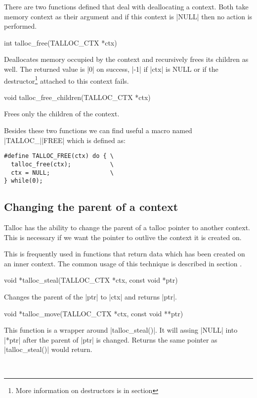 There are two functions defined that deal with deallocating a context. Both
take memory context as their argument and if this context is |NULL| then no
action is performed.

\begin{funcproto}
int talloc_free(TALLOC_CTX *ctx)
\end{funcproto}
\begin{funcdesc}
  Deallocates memory occupied by the context and recursively frees its 
  children as well. The returned value is |0| on success, |-1| if |ctx| is NULL
  or if the destructor\footnote{More information on destructors is in section
  } attached to this context fails.
\end{funcdesc}
\begin{funcproto}
void talloc_free_children(TALLOC_CTX *ctx)
\end{funcproto}
\begin{funcdesc}
  Frees only the children of the context.
\end{funcdesc}
\funclistend
Besides these two functions we can find useful a macro named |TALLOC_||FREE|
which is defined as:

\begin{lstlisting}[caption={TALLOC_FREE(ctx)},label=lst:TALLOC_FREE]
#define TALLOC_FREE(ctx) do { \
  talloc_free(ctx);           \
  ctx = NULL;                 \
} while(0);
\end{lstlisting}



\subsection{Changing the parent of a context}
\label{talloc:subsec:stealing}

Talloc has the ability to change the parent of a talloc pointer to another
context. This is necessary if we want the pointer to outlive the context it is
created on.

This is frequently used in functions that return data which has been created on
an inner context. The common usage of this technique is described in section
.

\begin{funcproto}
void *talloc_steal(TALLOC_CTX *ctx, const void *ptr)
\end{funcproto}
\begin{funcdesc}
  Changes the parent of the |ptr| to |ctx| and returns |ptr|.
\end{funcdesc}
\begin{funcproto}
void *talloc_move(TALLOC_CTX *ctx, const void **ptr)
\end{funcproto}
\begin{funcdesc}
  This function is a wrapper around |talloc_steal()|. It will assing |NULL| into
  |*ptr| after the parent of |ptr| is changed. Returns the same pointer as
  |talloc_steal()| would return.
\end{funcdesc}
\
